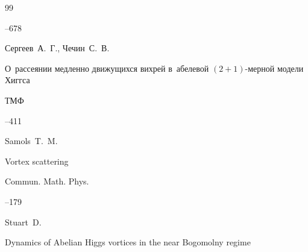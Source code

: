 \begin{thebibliography}{99}



--678





\by Сергеев~А.~Г., Чечин~С.~В.

\paper О~рассеянии медленно движущихся вихрей в~абелевой $({2+1})$-мерной модели Хиггса

\jour ТМФ




--411
















\by  Samols~T.~M.

\paper Vortex scattering

\jour  Commun. Math. Phys.




--179









\by Stuart~D.

\paper  Dynamics of Abelian Higgs vortices in the near Bogomolny regime 


\end{thebibliography}
